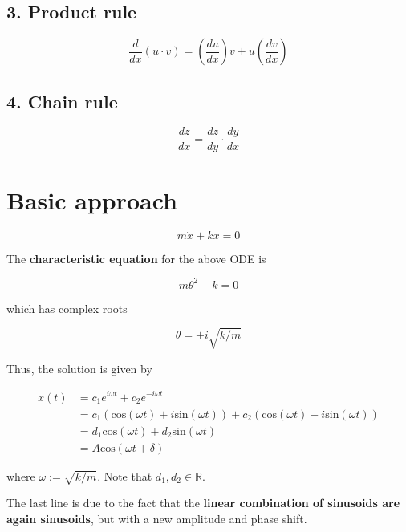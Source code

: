 \documentclass[12pt]{article}
\begin{document}
\subsection*{3. Product rule}

$$
\frac{d}{dx} \left( u \cdot v \right) = \left( \frac{du}{dx} \right) v + u  \left( \frac{dv}{dx} \right)
$$



\subsection*{4. Chain rule}

$$
\frac{dz}{dx} = \frac{dz}{dy} \cdot \frac{dy}{dx}
$$


\pagebreak
\section*{Basic approach}

\bigskip
\bigskip


$$
m \ddot{x} + k x = 0
$$

The \textbf{characteristic equation} for the above ODE is 

$$
m \theta^2 + k = 0
$$ 

which has complex roots

$$
\theta = \pm i \sqrt{k/m}
$$

Thus, the solution is given by

$$
\begin{aligned}
x(t) &= c_1 e^{i \omega t} + c_2 e^{-i \omega t} \\[8pt]
&= c_1 (\mathrm{cos} (\omega t) + i \mathrm{sin} (\omega t)) + c_2 (\mathrm{cos} (\omega t) - i \mathrm{sin} (\omega t)) \\[8pt]
&= d_1 \mathrm{cos} (\omega t) + d_2 \mathrm{sin} (\omega t) \\[8pt]
&= A \mathrm{cos} (\omega t + \delta)
\end{aligned}
$$

where $\omega := \sqrt{k/m}$. Note that $d_1, d_2 \in \mathbb{R}$. 

\bigskip

The last line is due to the fact that the \textbf{linear combination of sinusoids are again sinusoids}, but with a new amplitude and phase shift.
\end{document}

